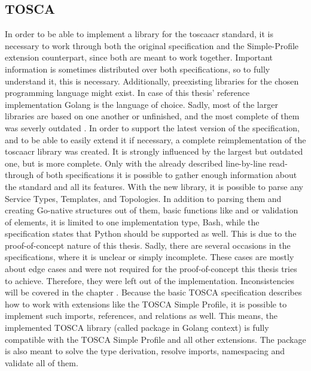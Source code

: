 \subsection{TOSCA}
In order to be able to implement a library for the \gls{toscaacr} standard, it is necessary to work through both the original specification and the Simple-Profile extension counterpart, since both are meant to work together. Important information is sometimes distributed over both specifications, so to fully understand it, this is necessary. Additionally, preexisting libraries for the chosen programming language might exist. In case of this thesis' reference implementation Golang is the language of choice. Sadly, most of the larger libraries are based on one another or unfinished, and the most complete of them was severly outdated \cite{github_toscalib_forks}.
\newline
In order to support the latest version of the specification, and to be able to easily extend it if necessary, a complete reimplementation of the \gls{toscaacr} library was created. It is strongly influenced by the largest but outdated one, but is more complete. Only with the already described line-by-line read-through of both specifications it is possible to gather enough information about the standard and all its features.
\newline
With the new library, it is possible to parse any Service Types, Templates, and Topologies.
In addition to parsing them and creating Go-native structures out of them, basic functions like  and  or validation of elements, it is limited to one implementation type, Bash, while the specification states that Python should be supported as well. This is due to the proof-of-concept nature of this thesis. Sadly, there are several occasions in the specifications, where it is unclear or simply incomplete. These cases are mostly about edge cases and were not required for the proof-of-concept this thesis tries to achieve. Therefore, they were left out of the implementation. Inconsistencies will be covered in the chapter .
\newline
Because the basic TOSCA specification describes how to work with extensions like the TOSCA Simple Profile, it is possible to implement such imports, references, and relations as well. This means, the implemented TOSCA library (called package in Golang context) is fully compatible with the TOSCA Simple Profile and all other extensions.
\newline
The package is also meant to solve the type derivation, resolve imports, namespacing and validate all of them.

